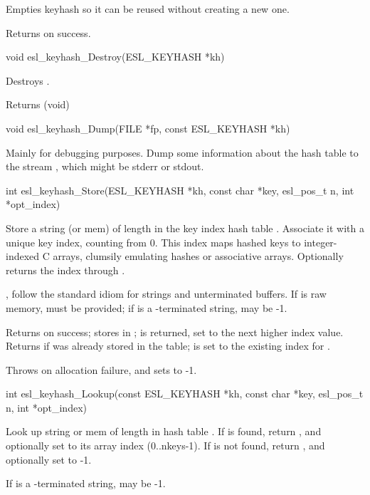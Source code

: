 \begin{sreapi}
Empties keyhash  so it can be reused without
creating a new one. 

Returns  on success.


\hypertarget{func:esl_keyhash_Destroy()}
{\item[void esl\_keyhash\_Destroy(ESL\_KEYHASH *kh)]}

Destroys .

Returns (void)


\hypertarget{func:esl_keyhash_Dump()}
{\item[void esl\_keyhash\_Dump(FILE *fp, const ESL\_KEYHASH *kh)]}

Mainly for debugging purposes. Dump 
some information about the hash table 
to the stream , which might be stderr
or stdout.


\hypertarget{func:esl_keyhash_Store()}
{\item[int esl\_keyhash\_Store(ESL\_KEYHASH *kh, const char *key, esl\_pos\_t n, int *opt\_index)]}

Store a string (or mem)  of length  in the key
index hash table .  Associate it with a unique key
index, counting from 0. This index maps hashed keys to
integer-indexed C arrays, clumsily emulating hashes or
associative arrays. Optionally returns the index through
.

,  follow the standard idiom for strings and
unterminated buffers. If  is raw memory,  must
be provided; if  is a \0-terminated string, 
may be -1.

Returns  on success; stores  in ;  is 
returned, set to the next higher index value.
Returns  if  was already stored in the table;
 is set to the existing index for .

Throws  on allocation failure, and sets  to -1.


\hypertarget{func:esl_keyhash_Lookup()}
{\item[int esl\_keyhash\_Lookup(const ESL\_KEYHASH *kh, const char *key, esl\_pos\_t n, int *opt\_index)]}

Look up string or mem  of length  in hash table .
If  is found, return , and optionally set 
to its array index (0..nkeys-1).
If  is not found, return , and
optionally set  to -1.

If  is a \0-terminated string,  may be -1. 


\end{sreapi}

